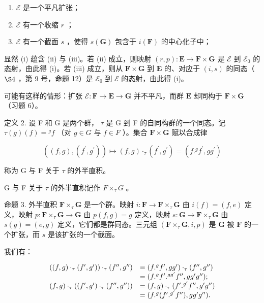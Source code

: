 \begin{enumerate}
\def\labelenumi{(\roman{enumi})}
\item
  \(\mathcal{E}\) 是一个平凡扩张；
\item
  \(\mathcal{E}\) 有一个收缩 \(r\) ；
\item
  \(\mathcal{E}\) 有一个截面 \(s\) ，使得 \(s(\mathbf{G})\) 包含于 \(i(\mathbf{F})\) 的中心化子中；
\end{enumerate}

显然 (i) 蕴含 (ii) 与 (iii)。若 (ii) 成立，则映射 \((r, p): \mathbf{E} \to \mathbf{F} \times \mathbf{G}\) 是 \(\mathcal{E}\) 到 \(\mathcal{E}_0\) 的态射，由此得 (i)。若 (iii) 成立，则从 \(\mathbf{F} \times \mathbf{G}\) 到 \(\mathbf{E}\) 的、对应于 \((i, s)\) 的同态（ \(\S 4\) ，第 9 号，命题 12）是 \(\mathcal{E}_0\) 到 \(\mathcal{E}\) 的态射，由此得 (i)。

可能有这样的情形：扩张 \(\mathcal{E}:\mathbf{F}\to\mathbf{E}\to\mathbf{G}\) 并不平凡，而群 \(\mathbf{E}\) 却同构于 \(\mathbf{F}\times\mathbf{G}\) （习题 6）。

定义 2. 设 F 和 G 是两个群， \(\tau\) 是 G 到 F 的自同构群的一个同态。记 \(\tau(g)(f) = {}^g f\) （对 \(g \in G\) 与 \(f \in F\) ）。集合 \(\mathbf{F} \times \mathbf{G}\) 赋以合成律

\[
((f, g), (f ^ {\prime}, g ^ {\prime})) \mapsto (f, g) \cdot_ {\tau} (f ^ {\prime}, g ^ {\prime}) = (f. ^ {g} f ^ {\prime}, g g ^ {\prime})\tag{1}
\]

称为 G 与 F 关于 \(\tau\) 的外半直积。

G 与 F 关于 \(\tau\) 的外半直积记作 \(F \times_{\tau} G\) 。

命题 3. 外半直积 \(\mathbf{F} \times_{\tau} \mathbf{G}\) 是一个群。映射 \(i: \mathbf{F} \to \mathbf{F} \times_{\tau} \mathbf{G}\) 由 \(i(f) = (f, e)\) 定义，映射 \(p: \mathbf{F} \times_{\tau} \mathbf{G} \to \mathbf{G}\) 由 \(p(f, g) = g\) 定义，映射 \(s: \mathbf{G} \to \mathbf{F} \times_{\tau} \mathbf{G}\) 由 \(s(g) = (e, g)\) 定义，它们都是群同态。三元组 \((\mathbf{F} \times_{\tau} \mathbf{G}, i, p)\) 是 \(\mathbf{G}\) 被 \(\mathbf{F}\) 的一个扩张，而 \(s\) 是该扩张的一个截面。

我们有：

\[
\begin{array}{r l} ((f, g) \cdot_ {\tau} (f ^ {\prime}, g ^ {\prime})) \cdot_ {\tau} (f ^ {\prime \prime}, g ^ {\prime \prime}) & = (f. ^ {g} f ^ {\prime}, g g ^ {\prime}) \cdot_ {\tau} (f ^ {\prime \prime}, g ^ {\prime \prime}) \\ & = (f. ^ {g} f ^ {\prime}. ^ {g g ^ {\prime}} f ^ {\prime \prime}, g g ^ {\prime} g ^ {\prime \prime}); \\ (f, g) \cdot_ {\tau} ((f ^ {\prime}, g ^ {\prime}) \cdot_ {\tau} (f ^ {\prime \prime}, g ^ {\prime \prime})) & = (f, g) \cdot_ {\tau} (f ^ {\prime}. ^ {g ^ {\prime}} f ^ {\prime \prime}, g ^ {\prime} g ^ {\prime \prime}) \\ & = (f. ^ {g} (f ^ {\prime}. ^ {g ^ {\prime}} f ^ {\prime \prime}), g g ^ {\prime} g ^ {\prime \prime}). \end{array}
\]

